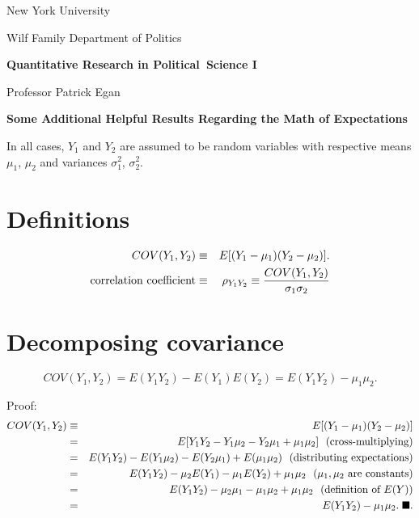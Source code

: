 \documentclass[11pt]{article}
\begin{document}
New York University

Wilf Family Department of Politics

\bigskip 

\begin{center}
{\large \textbf{Quantitative Research in Political\ Science I}}

Professor Patrick Egan

\bigskip

\textbf{Some Additional Helpful Results Regarding the Math of Expectations}
\end{center}

\bigskip In all cases, $Y_{1}$ and $Y_{2}$ are assumed to be random
variables with respective means $\mu _{1}$, $\mu _{2}$ and variances $\sigma
_{1}^{2}$, $\sigma _{2}^{2}.$ \bigskip

\section{Definitions}

\bigskip

\begin{eqnarray*}
COV(Y_{1},Y_{2}) &\equiv &E[(Y_{1}-\mu _{1})(Y_{2}-\mu _{2})]. \\
\text{correlation coefficient} &\equiv &\rho _{Y_{1}Y_{2}}\equiv \frac{%
COV(Y_{1},Y_{2})}{\sigma _{1}\sigma _{2}}
\end{eqnarray*}%
\bigskip

\section{Decomposing covariance\protect\bigskip}

\begin{equation*}
COV(Y_{1},Y_{2})=E(Y_{1}Y_{2})-E(Y_{1})E(Y_{2})=E(Y_{1}Y_{2})-\mu _{1}\mu
_{2}.
\end{equation*}

Proof:%
\begin{eqnarray*}
COV(Y_{1},Y_{2}) &\equiv &E[(Y_{1}-\mu _{1})(Y_{2}-\mu _{2})] \\
&=&E[Y_{1}Y_{2}-Y_{1}\mu _{2}-Y_{2}\mu _{1}+\mu _{1}\mu _{2}]\text{ \
(cross-multiplying)} \\
&=&E(Y_{1}Y_{2})-E(Y_{1}\mu _{2})-E(Y_{2}\mu _{1})+E(\mu _{1}\mu _{2})\text{
\ (distributing expectations)} \\
&=&E(Y_{1}Y_{2})-\mu _{2}E(Y_{1})-\mu _{1}E(Y_{2})+\mu _{1}\mu _{2}\text{ \ (%
}\mu _{1},\mu _{2}\text{ are constants)} \\
&=&E(Y_{1}Y_{2})-\mu _{2}\mu _{1}-\mu _{1}\mu _{2}+\mu _{1}\mu _{2}\text{ \
(definition of }E(Y)\text{)} \\
&=&E(Y_{1}Y_{2})-\mu _{1}\mu _{2}.\;\blacksquare .
\end{eqnarray*}%
\newpage 
\end{document}
